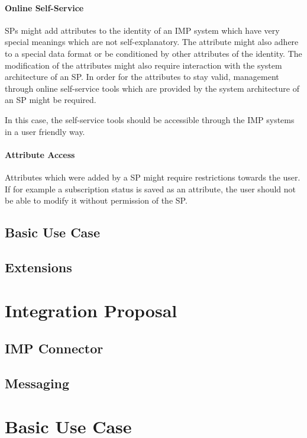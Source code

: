 \documentclass[
     12pt,         %
     a4paper,      %
     BCOR=10mm,version=first,     %
     DIV=14,version=first,        %
     ]{scrreprt}
\begin{document}
\paragraph{Online Self-Service}
SPs might add attributes to the identity of an IMP system which have very special meanings which are not self-explanatory. The attribute might also adhere to a special data format or be conditioned by other attributes of the identity. The modification of the attributes might also require interaction with the system architecture of an SP. In order for the attributes to stay valid, management through online self-service tools which are provided by the system architecture of an SP might be required.

In this case, the self-service tools should be accessible through the IMP systems in a user friendly way.

\paragraph{Attribute Access}
Attributes which were added by a SP might require restrictions towards the user. If for example a subscription status is saved as an attribute, the user should not be able to modify it without permission of the SP.

\subsection{Basic Use Case}

\subsection{Extensions}

\section{Integration Proposal}

\subsection{IMP Connector}

\subsection{Messaging}

\section{Basic Use Case}
\end{document}
